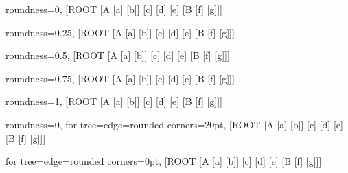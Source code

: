 \documentclass{article}
\newcommand{\RoundnessCase}[1]{%
  \begin{fittedterminaltree}
    #1
    [ROOT [A [a] [b]] [c] [d] [e] [B [f] [g]]]
  \end{fittedterminaltree}
}
\begin{document}
\RoundnessCase{roundness=0,}
\RoundnessCase{roundness=0.25,}
\RoundnessCase{roundness=0.5,}
\RoundnessCase{roundness=0.75,}
\RoundnessCase{roundness=1,}
\RoundnessCase{roundness=0, for tree={edge={rounded corners=20pt}},}
\RoundnessCase{for tree={edge={rounded corners=0pt}},}
\end{document}
